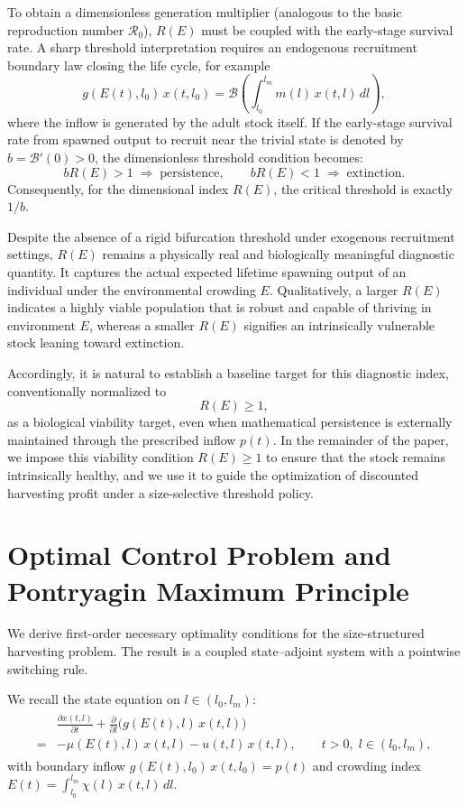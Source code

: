 \documentclass[pdflatex,sn-mathphys-num]{sn-jnl}
\theoremstyle{thmstyleone}
\theoremstyle{definition}
\theoremstyle{remark}
\begin{document}
To obtain a dimensionless generation multiplier (analogous to the basic reproduction number $\mathcal{R}_0$), $R(E)$ must be coupled with the early-stage survival rate. A sharp threshold interpretation requires an endogenous recruitment boundary law closing the life cycle, for example
\[
g(E(t),l_0)\,x(t,l_0)
=
\mathcal{B}\left(\int_{l_0}^{l_m} m(l)\,x(t,l)\,dl\right),
\]
where the inflow is generated by the adult stock itself. If the early-stage survival rate from spawned output to recruit near the trivial state is denoted by $b = \mathcal{B}'(0) > 0$, the dimensionless threshold condition becomes:
\[
b R(E)>1 \;\Rightarrow\; \text{persistence},
\qquad
b R(E)<1 \;\Rightarrow\; \text{extinction}.
\]
Consequently, for the dimensional index $R(E)$, the critical threshold is exactly $1/b$. 

Despite the absence of a rigid bifurcation threshold under exogenous recruitment settings, $R(E)$ remains a physically real and biologically meaningful diagnostic quantity. It captures the actual expected lifetime spawning output of an individual under the environmental crowding $E$. Qualitatively, a larger $R(E)$ indicates a highly viable population that is robust and capable of thriving in environment $E$, whereas a smaller $R(E)$ signifies an intrinsically vulnerable stock leaning toward extinction.

Accordingly, it is natural to establish a baseline target for this diagnostic index, conventionally normalized to 
\[
R(E)\ge 1,
\]
as a biological viability target, even when mathematical persistence is externally maintained through the prescribed inflow $p(t)$. In the remainder of the paper, we impose this viability condition $R(E)\ge 1$ to ensure that the stock remains intrinsically healthy, and we use it to guide the optimization of discounted harvesting profit under a size-selective threshold policy.

\section{Optimal Control Problem and Pontryagin Maximum Principle}\label{sec:objective}

We derive first-order necessary optimality conditions for the
size-structured harvesting problem. The result is a coupled state--adjoint system
with a pointwise switching rule.

We recall the state equation on $l\in(l_0,l_m)$:
\begin{align}\label{eq:state_pmp}
\begin{aligned}
&\frac{\partial x(t,l)}{\partial t}
+\frac{\partial}{\partial l}\Big(g(E(t),l)\,x(t,l)\Big) \\[4pt]
={}&
-\mu(E(t),l)\,x(t,l)-u(t,l)\,x(t,l),
\qquad t>0,\; l\in(l_0,l_m),
\end{aligned}
\end{align}
with boundary inflow $g(E(t),l_0)\,x(t,l_0)=p(t)$ and crowding index
$E(t)=\int_{l_0}^{l_m}\chi(l)\,x(t,l)\,dl$.
\end{document}
